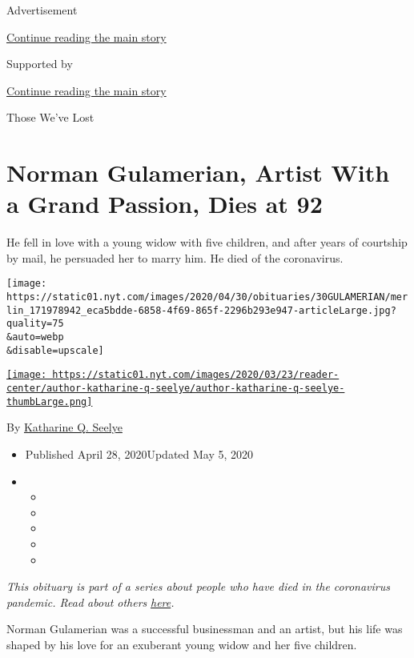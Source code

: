 Advertisement

\protect\hyperlink{after-top}{Continue reading the main story}

Supported by

\protect\hyperlink{after-sponsor}{Continue reading the main story}

Those We've Lost

\hypertarget{norman-gulamerian-artist-with-a-grand-passion-dies-at-92}{%
\section{Norman Gulamerian, Artist With a Grand Passion, Dies at
92}\label{norman-gulamerian-artist-with-a-grand-passion-dies-at-92}}

He fell in love with a young widow with five children, and after years
of courtship by mail, he persuaded her to marry him. He died of the
coronavirus.

\texttt{[image: https://static01.nyt.com/images/2020/04/30/obituaries/30GULAMERIAN/merlin\_171978942\_eca5bdde-6858-4f69-865f-2296b293e947-articleLarge.jpg?quality=75\\\&auto=webp\\\&disable=upscale]}

\href{https://www.nytimes.com/by/katharine-q-seelye}{\texttt{[image: https://static01.nyt.com/images/2020/03/23/reader-center/author-katharine-q-seelye/author-katharine-q-seelye-thumbLarge.png]}}

By \href{https://www.nytimes.com/by/katharine-q-seelye}{Katharine Q.
Seelye}

\begin{itemize}
\item
  Published April 28, 2020Updated May 5, 2020
\item
  \begin{itemize}
  \item
  \item
  \item
  \item
  \item
  \end{itemize}
\end{itemize}

\emph{This obituary is part of a series about people who have died in
the coronavirus pandemic. Read about others}
\href{https://www.nytimes.com/series/people-who-have-died-of-the-coronavirus}{\emph{here}}\emph{.}

Norman Gulamerian was a successful businessman and an artist, but his
life was shaped by his love for an exuberant young widow and her five
children.


